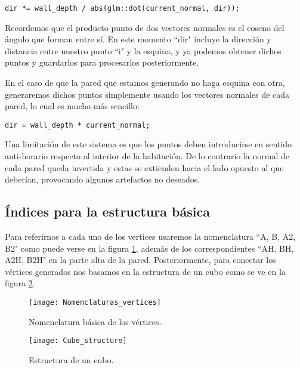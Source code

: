 \begin{lstlisting}
dir *= wall_depth / abs(glm::dot(current_normal, dir));
\end{lstlisting}

Recordemos que el producto punto de dos vectores normales es el coseno del ángulo que forman entre sí. En este momento ``dir" incluye la dirección y distancia entre nuestro punto ``i" y la esquina, y ya podemos obtener dichos puntos y guardarlos para procesarlos posteriormente.

En el caso de que la pared que estamos generando no haga esquina con otra, generaremos dichos puntos simplemente usando los vectores normales de cada pared, lo cual es mucho más sencillo:

\begin{lstlisting}
dir = wall_depth * current_normal;
\end{lstlisting}

Una limitación de este sistema es que los puntos deben introducirse en sentido anti-horario respecto al interior de la habitación. De lo contrario la normal de cada pared queda invertida y estas se extienden hacia el lado opuesto al que deberían, provocando algunos artefactos no deseados.

\subsection{Índices para la estructura básica}
Para referirnos a cada uno de los vertices usaremos la nomenclatura ``A, B, A2, B2" como puede verse en la figura \ref{fig:nomenclatura_vertices}, además de los correspondientes ``AH, BH, A2H, B2H" en la parte alta de la pared. Posteriormente, para conectar los vértices generados nos basamos en la estructura de un cubo como se ve en la figura \ref{fig:estructura_cubo}.

\begin{figure}[H]
    \centering
    \texttt{[image: Nomenclaturas\_vertices]}
    \caption{Nomenclatura básica de los vértices.}
    \label{fig:nomenclatura_vertices}
\end{figure}

\begin{figure}[H]
	\centering
	\texttt{[image: Cube\_structure]}
	\caption{Estructura de un cubo.}
	\label{fig:estructura_cubo}
\end{figure}

